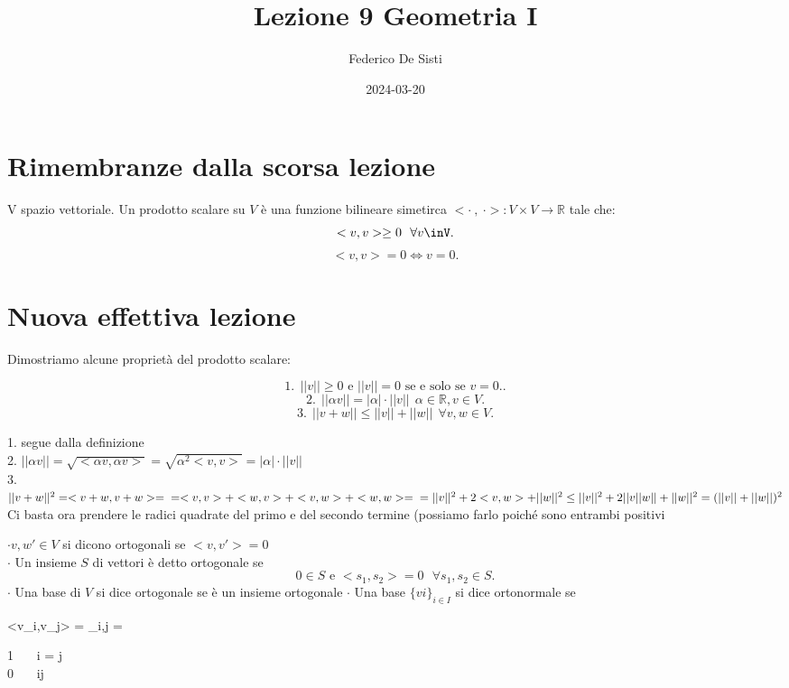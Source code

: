 \documentclass[12px]{article}
\title{Lezione 9 Geometria I}
\date{2024-03-20}
\author{Federico De Sisti}
\begin{document}
	\maketitle
	\newpage
	\section{Rimembranze dalla scorsa lezione}
	V spazio vettoriale. Un prodotto scalare su $V$ è una funzione bilineare simetirca $< \cdot \ , \ \cdot> : V\times V \rightarrow \mathbb{R}$ tale che: \[
	<v,v> \geq 0 \ \ \forall v\inV
	.\] 
	\[
	<v,v> = 0 \Leftrightarrow v = 0
	.\] 
	\section{Nuova effettiva lezione}
Dimostriamo alcune proprietà del prodotto scalare: 
\begin{lemm} 
	\[
	1. \ \ ||v|| \geq 0 \text{ e } ||v|| = 0 \text{ se e solo se } v = 0. .\]
\[
	2. \ \ ||\alpha v|| = |\alpha| \cdot ||v|| \ \ \alpha\in \mathbb{R}, v\in V
.\] 
\[
3. \ \ ||v + w|| \leq ||v|| + ||w|| \ \ \forall v, w\in V
.\] 
\end{lemm}
\begin{dimo}
	1. segue dalla definizione \\
	2. $||\alpha v|| = \sqrt{<\alpha v,\alpha v>} = \sqrt{\alpha^2 <v,v>} = |\alpha| \cdot ||v||$ \\
	3. $||v + w||^2 = <v+w,v+w> = \\ = <v,v> + <w,v> + <v,w> + <w,w> = \\ = ||v||^2 + 2<v,w> + ||w||^2 \leq ||v||^2 + 2||v||w|| + ||w||^2 = (||v|| + ||w||)^2$ \\
	Ci basta ora prendere le radici quadrate del primo e del secondo termine (possiamo farlo poiché sono entrambi positivi
\end{dimo}
\begin{nome}
	$\cdot v,w'\in V$ si dicono ortogonali se $<v,v'>=0$ \\
	$\cdot$ Un insieme $S$ di vettori è detto ortogonale se \[
		0\in S \text{ e } <s_1,s_2> = 0 \ \ \ \forall s_1,s_2 \in S
	.\] 
	$\cdot$ Una base di $V$ si dice ortogonale se è un insieme ortogonale
	$\cdot$ Una base $\{vi\}_{i\in I}$ si dice ortonormale se 
	\begin{aligned}
		<v_i,v_j> = \delta_{i,j} =
		\begin{sistema}
			1 \ \ \ i = j \\
			0 \ \ \ i\neq j
		\end{sistema}
	\end{aligned}
\end{nome}
\end{document}
